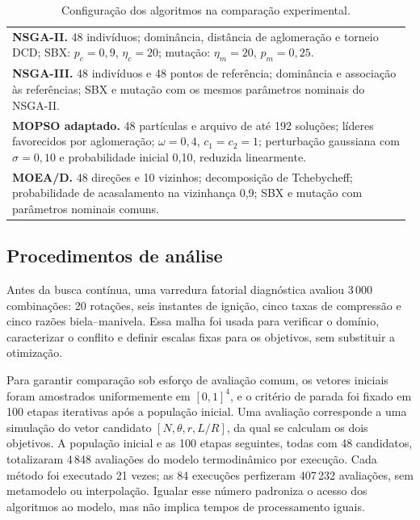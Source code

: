 \documentclass[a4paper,11pt]{article}
\begin{document}
\begin{table}[htbp]
\centering
\caption{Configuração dos algoritmos na comparação experimental.}
\label{tab:configuracao-algoritmos}
\small
\begin{tabular}{@{}>{\raggedright\arraybackslash}p{0.98\linewidth}@{}}
\toprule
\textbf{NSGA-II.}
48 indivíduos; dominância, distância de aglomeração e torneio DCD; SBX:
$p_c=0{,}9$, $\eta_c=20$; mutação: $\eta_m=20$, $p_m=0{,}25$. \\[1mm]
\textbf{NSGA-III.}
48 indivíduos e 48 pontos de referência; dominância e associação às
referências; SBX e mutação com os mesmos parâmetros nominais do NSGA-II. \\[1mm]
\textbf{MOPSO adaptado.}
48 partículas e arquivo de até 192 soluções; líderes favorecidos por
aglomeração; $\omega=0{,}4$, $c_1=c_2=1$; perturbação gaussiana com
$\sigma=0{,}10$ e probabilidade inicial 0,10, reduzida linearmente. \\[1mm]
\textbf{MOEA/D.}
48 direções e 10 vizinhos; decomposição de Tchebycheff; probabilidade de
acasalamento na vizinhança 0,9; SBX e mutação com parâmetros nominais comuns. \\
\bottomrule
\end{tabular}
\end{table}

\subsection{Procedimentos de análise}
\label{subsec:procedimentos}

Antes da busca contínua, uma varredura fatorial diagnóstica avaliou 3\,000
combinações: 20 rotações, seis instantes de ignição, cinco taxas de compressão
e cinco razões biela--manivela. Essa malha foi usada para verificar o domínio,
caracterizar o conflito e definir escalas fixas para os objetivos, sem
substituir a otimização.

Para garantir comparação sob esforço de avaliação comum, os vetores iniciais
foram amostrados uniformemente em $[0,1]^4$, e o critério de parada foi fixado
em 100 etapas iterativas após a população inicial. Uma avaliação corresponde a
uma simulação do vetor candidato $[N,\theta,r,L/R]$, da qual se calculam os dois
objetivos. A população inicial e as 100 etapas seguintes, todas com 48
candidatos, totalizaram 4\,848 avaliações do modelo termodinâmico por execução.
Cada método foi executado 21 vezes; as 84 execuções perfizeram 407\,232
avaliações, sem metamodelo ou interpolação. Igualar esse número padroniza o
acesso dos algoritmos ao modelo, mas não implica tempos de processamento
iguais.
\end{document}
